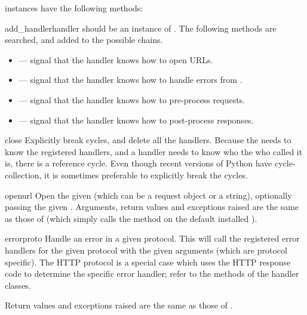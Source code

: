  instances have the following methods:

\begin{methoddesc}[OpenerDirector]{add_handler}{handler}
 should be an instance of .  The
following methods are searched, and added to the possible chains.

\begin{itemize}
  \item {} ---
    signal that the handler knows how to open  URLs.
  \item {} ---
    signal that the handler knows how to handle  errors from
    .
  \item {} ---
    signal that the handler knows how to pre-process 
    requests.
  \item {} ---
    signal that the handler knows how to post-process 
    responses.
\end{itemize}
\end{methoddesc}

\begin{methoddesc}[OpenerDirector]{close}{}
Explicitly break cycles, and delete all the handlers.
Because the  needs to know the registered handlers,
and a handler needs to know who the  who called
it is, there is a reference cycle.  Even though recent versions of Python
have cycle-collection, it is sometimes preferable to explicitly break
the cycles.
\end{methoddesc}

\begin{methoddesc}[OpenerDirector]{open}{url}
Open the given  (which can be a request object or a string),
optionally passing the given .
Arguments, return values and exceptions raised are the same as those
of  (which simply calls the  method
on the default installed ).
\end{methoddesc}

\begin{methoddesc}[OpenerDirector]{error}{proto}
Handle an error in a given protocol.  This will call the registered
error handlers for the given protocol with the given arguments (which
are protocol specific).  The HTTP protocol is a special case which
uses the HTTP response code to determine the specific error handler;
refer to the  methods of the handler classes.

Return values and exceptions raised are the same as those
of .
\end{methoddesc}


